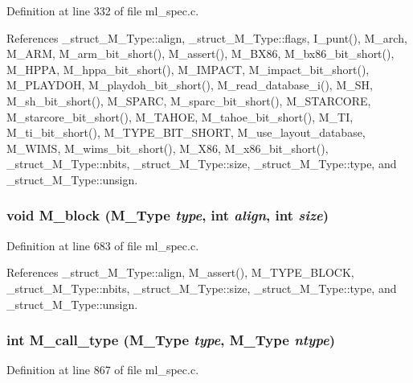 Definition at line 332 of file ml\_\-spec.c.

References \_\-struct\_\-M\_\-Type::align, \_\-struct\_\-M\_\-Type::flags, I\_\-punt(), M\_\-arch, M\_\-ARM, M\_\-arm\_\-bit\_\-short(), M\_\-assert(), M\_\-BX86, M\_\-bx86\_\-bit\_\-short(), M\_\-HPPA, M\_\-hppa\_\-bit\_\-short(), M\_\-IMPACT, M\_\-impact\_\-bit\_\-short(), M\_\-PLAYDOH, M\_\-playdoh\_\-bit\_\-short(), M\_\-read\_\-database\_\-i(), M\_\-SH, M\_\-sh\_\-bit\_\-short(), M\_\-SPARC, M\_\-sparc\_\-bit\_\-short(), M\_\-STARCORE, M\_\-starcore\_\-bit\_\-short(), M\_\-TAHOE, M\_\-tahoe\_\-bit\_\-short(), M\_\-TI, M\_\-ti\_\-bit\_\-short(), M\_\-TYPE\_\-BIT\_\-SHORT, M\_\-use\_\-layout\_\-database, M\_\-WIMS, M\_\-wims\_\-bit\_\-short(), M\_\-X86, M\_\-x86\_\-bit\_\-short(), \_\-struct\_\-M\_\-Type::nbits, \_\-struct\_\-M\_\-Type::size, \_\-struct\_\-M\_\-Type::type, and \_\-struct\_\-M\_\-Type::unsign.
\subsubsection{\setlength{\rightskip}{0pt plus 5cm}void M\_\-block (\bf{M\_\-Type} {\em type}, int {\em align}, int {\em size})}\label{m__spec_8h_eef80ed5746d648b6eb1d2348b85c8fb}




Definition at line 683 of file ml\_\-spec.c.

References \_\-struct\_\-M\_\-Type::align, M\_\-assert(), M\_\-TYPE\_\-BLOCK, \_\-struct\_\-M\_\-Type::nbits, \_\-struct\_\-M\_\-Type::size, \_\-struct\_\-M\_\-Type::type, and \_\-struct\_\-M\_\-Type::unsign.
\subsubsection{\setlength{\rightskip}{0pt plus 5cm}int M\_\-call\_\-type (\bf{M\_\-Type} {\em type}, \bf{M\_\-Type} {\em ntype})}\label{m__spec_8h_2aae03c2abaef2f5f46b6933af6bc007}




Definition at line 867 of file ml\_\-spec.c.

